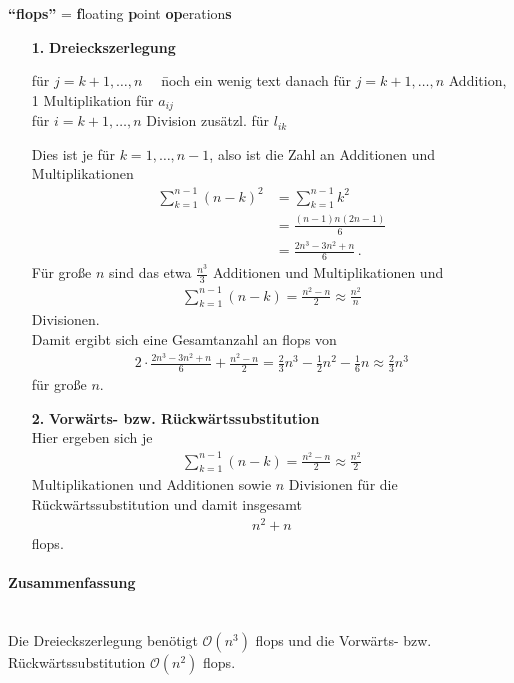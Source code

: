 \textbf{\enquote{flops} }= \textbf{f}loating \textbf{p}oint \textbf{op}eration\textbf{s} \\
\begin{enumerate}
\item[\textbf{1.}] \textbf{Dreieckszerlegung} 
  \begin{tabbing}
    für $j=k+1, \dots, n\quad$ \= noch ein wenig text danach \kill
    für $j=k+1, \dots, n$  Addition, 1 Multiplikation für $a_{ij}$ \\
    für $i=k+1, \dots, n$  Division zusätzl. für $ l_{ik}$
  \end{tabbing}
  Dies ist je für $k=1, \dots, n-1$, also ist die Zahl an Additionen und Multiplikationen
  \begin{align*}
    \sum_{k=1}^{n-1}(n-k)^2 &= \sum_{k=1}^{n-1}k^2 \\
                            &= \frac{(n-1)n(2n-1)}{6} \\
                            &= \frac{2n^3-3n^2+n}{6}\, .
  \end{align*}
  Für große $n$ sind das etwa $\frac{n^3}{3}$ Additionen und Multiplikationen und
  \begin{gather*}
    \sum_{k=1}^{n-1} (n-k) = \frac{n^2-n}{2} \approx \frac{n^2}{n}
  \end{gather*}
  Divisionen. \\
  Damit ergibt sich eine Gesamtanzahl an flops von
  \begin{gather*}
    2\cdot\frac{2n^3-3n^2+n}{6} + \frac{n^2-n}{2} 
    = \frac{2}{3} n^3 - \frac{1}{2}n^2 - \frac{1}{6} n
    \approx \frac{2}{3}n^3
  \end{gather*}
  für große $n$.
  
\item[\textbf{2.}] \textbf{Vorwärts- bzw. Rückwärtssubstitution}  \\
  Hier ergeben sich je
  \begin{gather*}
    \sum_{k=1}^{n-1} (n-k) = \frac{n^2-n}{2} \approx \frac{n^2}{2}
  \end{gather*}
  Multiplikationen und Additionen sowie 
  $n$ Divisionen für die Rückwärtssubstitution und damit insgesamt \begin{gather*}n^2+n\end{gather*} flops.	
\end{enumerate}
\paragraph{Zusammenfassung}~ \\
Die Dreieckszerlegung benötigt $\mathcal{O}(n^3)$ flops und 
die Vorwärts- bzw. Rückwärtssubstitution $\mathcal{O}(n^2)$ flops.



